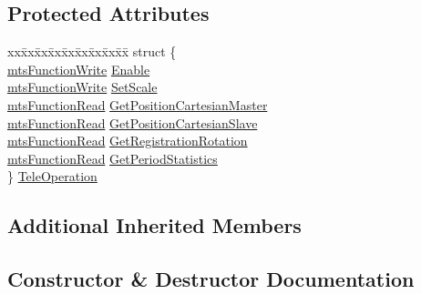 \subsection*{Protected Attributes}
\begin{DoxyCompactItemize}
\item 
\begin{tabbing}
xx\=xx\=xx\=xx\=xx\=xx\=xx\=xx\=xx\=\kill
struct \{\\
\>\hyperlink{classmts_function_write}{mtsFunctionWrite} \hyperlink{classmts_tele_operation_qt_widget_ac031ba3e7dbdfba30b1f259a5109b7a7}{Enable}\\
\>\hyperlink{classmts_function_write}{mtsFunctionWrite} \hyperlink{classmts_tele_operation_qt_widget_ac2898212c3092185dd4a86dabfc8669e}{SetScale}\\
\>\hyperlink{classmts_function_read}{mtsFunctionRead} \hyperlink{classmts_tele_operation_qt_widget_a9ffb4a1017237ee19a112b598698fa64}{GetPositionCartesianMaster}\\
\>\hyperlink{classmts_function_read}{mtsFunctionRead} \hyperlink{classmts_tele_operation_qt_widget_a79f316cb32e00b6562055802ebe7303c}{GetPositionCartesianSlave}\\
\>\hyperlink{classmts_function_read}{mtsFunctionRead} \hyperlink{classmts_tele_operation_qt_widget_a304765452ec072593f21b09016ef74d2}{GetRegistrationRotation}\\
\>\hyperlink{classmts_function_read}{mtsFunctionRead} \hyperlink{classmts_tele_operation_qt_widget_a7ce8de289a4a1b48735de5ce6d278bc3}{GetPeriodStatistics}\\
\} \hyperlink{classmts_tele_operation_qt_widget_a74e562371df2d0e16754c5f6dbd1a1e5}{TeleOperation}\\

\end{tabbing}\end{DoxyCompactItemize}
\subsection*{Additional Inherited Members}


\subsection{Constructor \& Destructor Documentation}
\hypertarget{classmts_tele_operation_qt_widget_a332a9b14cae2e0d3effbfb6e7f89d8fa}{}
